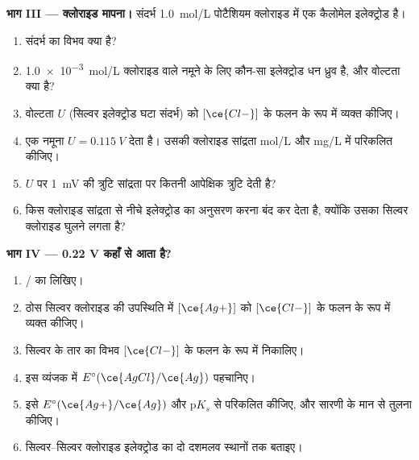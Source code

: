 \begin{problem}
\medskip
\noindent\textbf{भाग III --- क्लोराइड मापना।}
संदर्भ \qty{1.0}{mol/L} पोटैशियम क्लोराइड में एक कैलोमेल इलेक्ट्रोड
है।
\begin{enumerate}[resume]
  \item संदर्भ का विभव क्या है?
  \item \qty{1.0e-3}{mol/L} क्लोराइड वाले नमूने के लिए कौन-सा इलेक्ट्रोड
        धन ध्रुव है, और वोल्टता क्या है?
  \item वोल्टता $U$ (सिल्वर इलेक्ट्रोड घटा संदर्भ) को
        $[\ce{Cl-}]$ के फलन के रूप में व्यक्त कीजिए।
  \item एक नमूना $U = \qty{0.115}{V}$ देता है। उसकी क्लोराइड
        सांद्रता \unit{mol/L} और \unit{mg/L} में परिकलित कीजिए।
  \item $U$ पर \qty{1}{mV} की त्रुटि सांद्रता पर कितनी आपेक्षिक त्रुटि
        देती है?
  \item किस क्लोराइड सांद्रता से नीचे इलेक्ट्रोड  का अनुसरण करना
        बंद कर देता है, क्योंकि उसका सिल्वर क्लोराइड घुलने लगता है?
\end{enumerate}

\medskip
\noindent\textbf{भाग IV --- 0.22 V कहाँ से आता है?}
\begin{enumerate}[resume]
  \item {}/ का  लिखिए।
  \item ठोस सिल्वर क्लोराइड की उपस्थिति में $[\ce{Ag+}]$ को
        $[\ce{Cl-}]$ के फलन के रूप में व्यक्त कीजिए।
  \item सिल्वर के तार का विभव
        $[\ce{Cl-}]$ के फलन के रूप में निकालिए।
  \item इस व्यंजक में $E^\circ(\ce{AgCl}/\ce{Ag})$ पहचानिए।
  \item इसे $E^\circ(\ce{Ag+}/\ce{Ag})$ और $\mathrm{p}K_s$ से परिकलित कीजिए, और
        सारणी के मान से तुलना कीजिए।
  \item सिल्वर--सिल्वर क्लोराइड इलेक्ट्रोड का  दो दशमलव स्थानों तक
        बताइए।
\end{enumerate}
\end{problem}
